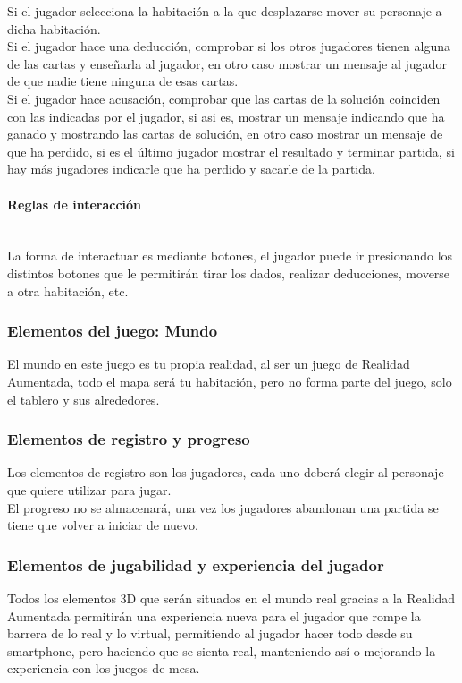 Si el jugador selecciona la habitación a la que desplazarse mover su personaje a dicha habitación.\\

Si el jugador hace una deducción, comprobar si los otros jugadores tienen alguna de las cartas y enseñarla al jugador, en otro caso mostrar un mensaje al jugador de que nadie tiene ninguna de esas cartas.\\

Si el jugador hace acusación, comprobar que las cartas de la solución coinciden con las indicadas por el jugador, si asi es, mostrar un mensaje indicando que ha ganado y mostrando las cartas de solución, en otro caso mostrar un mensaje de que ha perdido, si es el último jugador mostrar el resultado y terminar partida, si hay más jugadores indicarle que ha perdido y sacarle de la partida.

\paragraph{Reglas de interacción}\mbox{}\\
La forma de interactuar es mediante botones, el jugador puede ir presionando los distintos botones que le permitirán tirar los dados, realizar deducciones, moverse a otra habitación, etc.

\subsubsection{Elementos del juego: Mundo}
El mundo en este juego es tu propia realidad, al ser un juego de Realidad Aumentada, todo el mapa será tu habitación, pero no forma parte del juego, solo el tablero y sus alrededores.


\subsubsection{Elementos de registro y progreso}
Los elementos de registro son los jugadores, cada uno deberá elegir al personaje que quiere utilizar para jugar.\\

El progreso no se almacenará, una vez los jugadores abandonan una partida se tiene que volver a iniciar de nuevo.

\subsubsection{Elementos de jugabilidad y experiencia del jugador}
Todos los elementos 3D que serán situados en el mundo real gracias a la Realidad Aumentada permitirán una experiencia nueva para el jugador que rompe la barrera de lo real y lo virtual, permitiendo al jugador hacer todo desde su smartphone, pero haciendo que se sienta real, manteniendo así o mejorando la experiencia con los juegos de mesa.



